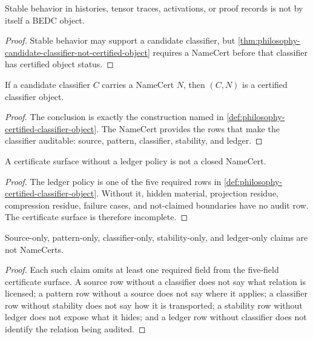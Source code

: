 \begin{corollary}
\label{cor:philosophy-stable-behavior-not-objecthood}
Stable behavior in histories, tensor traces, activations, or proof
records is not by itself a BEDC object.
\end{corollary}
\begin{proof}
Stable behavior may support a candidate classifier, but
\autoref{thm:philosophy-candidate-classifier-not-certified-object}
requires a NameCert before that classifier has certified object status.
\end{proof}

\begin{theorem}
\label{thm:philosophy-namecert-licenses-classifier-objecthood}
If a candidate classifier $C$ carries a NameCert $N$, then $(C,N)$ is a
certified classifier object.
\end{theorem}
\begin{proof}
The conclusion is exactly the construction named in
\autoref{def:philosophy-certified-classifier-object}. The NameCert
provides the rows that make the classifier auditable: source, pattern,
classifier, stability, and ledger.
\end{proof}

\begin{theorem}
\label{thm:philosophy-no-ledger-no-closed-certificate}
A certificate surface without a ledger policy is not a closed NameCert.
\end{theorem}
\begin{proof}
The ledger policy is one of the five required rows in
\autoref{def:philosophy-certified-classifier-object}. Without it, hidden
material, projection residue, compression residue, failure cases, and
not-claimed boundaries have no audit row. The certificate surface is
therefore incomplete.
\end{proof}

\begin{corollary}
\label{cor:philosophy-single-field-claims-not-namecerts}
Source-only, pattern-only, classifier-only, stability-only, and
ledger-only claims are not NameCerts.
\end{corollary}
\begin{proof}
Each such claim omits at least one required field from the five-field
certificate surface. A source row without a classifier does not say what
relation is licensed; a pattern row without a source does not say where
it applies; a classifier row without stability does not say how it is
transported; a stability row without ledger does not expose what it hides;
and a ledger row without classifier does not identify the relation being
audited.
\end{proof}

